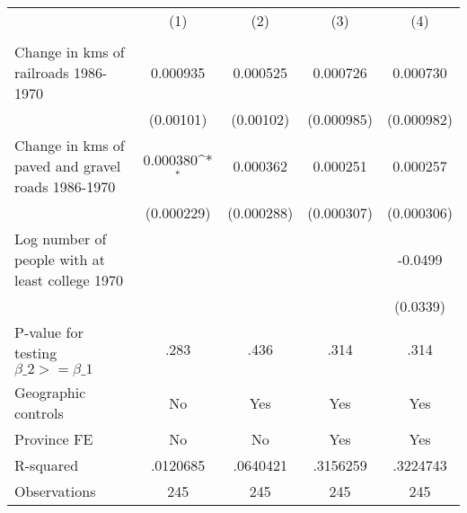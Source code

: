 {
\def\sym#1{\ifmmode^{#1}\else\(^{#1}\)\fi}
\begin{tabular}{l*{4}{c}}
\hline\hline
                &\multicolumn{1}{c}{(1)}&\multicolumn{1}{c}{(2)}&\multicolumn{1}{c}{(3)}&\multicolumn{1}{c}{(4)}\\
                &\multicolumn{1}{c}{}&\multicolumn{1}{c}{}&\multicolumn{1}{c}{}&\multicolumn{1}{c}{}\\
\hline
Change in kms of railroads 1986-1970& 0.000935         & 0.000525         & 0.000726         & 0.000730         \\
                &(0.00101)         &(0.00102)         &(0.000985)         &(0.000982)         \\
[1em]
Change in kms of paved and gravel roads 1986-1970& 0.000380\sym{*}  & 0.000362         & 0.000251         & 0.000257         \\
                &(0.000229)         &(0.000288)         &(0.000307)         &(0.000306)         \\
[1em]
Log number of people with at least college 1970&                  &                  &                  &  -0.0499         \\
                &                  &                  &                  & (0.0339)         \\
\hline
P-value for testing $\beta\_{2} >= \beta\_{1}$&     .283         &     .436         &     .314         &     .314         \\
Geographic controls&       No         &      Yes         &      Yes         &      Yes         \\
Province FE     &       No         &       No         &      Yes         &      Yes         \\
R-squared       & .0120685         & .0640421         & .3156259         & .3224743         \\
Observations    &      245         &      245         &      245         &      245         \\
\hline\hline
\end{tabular}
}
